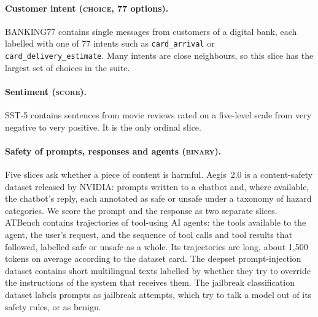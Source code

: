 \paragraph{Customer intent (\textsc{choice}, 77 options).} BANKING77
\citep{casanueva2020banking77} contains single messages from customers of a
digital bank, each labelled with one of 77 intents such as \texttt{card\_arrival}
or \texttt{card\_delivery\_estimate}. Many intents are close neighbours, so this
slice has the largest set of choices in the suite.

\paragraph{Sentiment (\textsc{score}).} SST-5 \citep{socher2013sst} contains
sentences from movie reviews rated on a five-level scale from very negative to
very positive. It is the only ordinal slice.

\paragraph{Safety of prompts, responses and agents (\textsc{binary}).} Five
slices ask whether a piece of content is harmful. Aegis~2.0
\citep{ghosh2025aegis2} is a content-safety dataset released by NVIDIA: prompts
written to a chatbot and, where available, the chatbot's reply, each annotated
as safe or unsafe under a taxonomy of hazard categories. We score the prompt and
the response as two separate slices. ATBench \citep{li2026atbench} contains
trajectories of tool-using AI agents: the tools available to the agent, the
user's request, and the sequence of tool calls and tool results that followed,
labelled safe or unsafe as a whole. Its trajectories are long, about 1{,}500
tokens on average according to the dataset card. The deepset prompt-injection
dataset \citep{deepset2023promptinjections} contains short multilingual texts
labelled by whether they try to override the instructions of the system that
receives them. The jailbreak classification dataset
\citep{jackhhao2023jailbreak} labels prompts as jailbreak attempts, which try to
talk a model out of its safety rules, or as benign.

